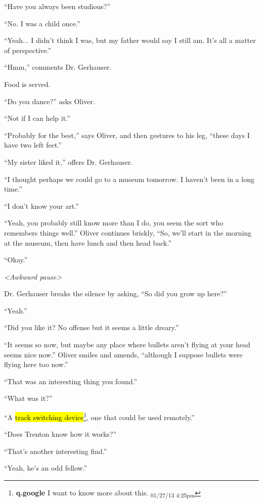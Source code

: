 ``Have you always been studious?''

``No. I was a child once.''

``Yeah... I didn't think I was, but my father would say I still am.  It's all a matter of perspective.''

``Hmm,'' comments Dr. Gerhauser.



Food is served. 



``Do you dance?'' asks Oliver.

``Not if I can help it.''

``Probably for the best,'' says Oliver, and then gestures to his leg, ``these days I have two left feet.''

``My sister liked it,'' offers Dr. Gerhauser.

``I thought perhaps we could go to a museum tomorrow.  I haven't been in a long time.''

``I don't know your art.''

``Yeah, you probably still know more than I do, you seem the sort who remembers things well.''  Oliver continues briskly, ``So, we'll start in the morning at the museum, then have lunch and then head back.''

``Okay.''

\textit{\textless Awkward pause\textgreater }

Dr. Gerhauser breaks the silence by asking, ``So did you grow up here?''

``Yeah.''

``Did you like it?  No offense but it seems a little dreary.''

``It seems so now, but maybe any place where bullets aren't flying at your head seems nice now.''  Oliver smiles and amends, ``although I suppose bullets were flying here too now.''

``That was an interesting thing you found.''

``What was it?''

``A \hl{track switching device}\footnote{\textbf{q.google }I want to know more about this. \textsubscript{01/27/13 4:25pm}}, one that could be used remotely.''

``Does Trenton know how it works?''

``That's another interesting find.''

``Yeah, he's an odd fellow.''

